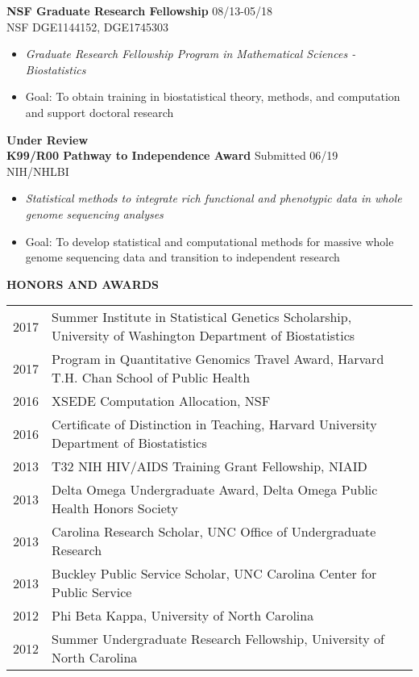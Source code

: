 \documentclass[10pt]{article}
\begin{document}
\textbf{NSF Graduate Research Fellowship} \hfill 08/13-05/18\\
\indent NSF DGE1144152, DGE1745303
\begin{itemize}
	\item \textit{Graduate Research Fellowship Program in Mathematical Sciences - Biostatistics}
	\item Goal: To obtain training in biostatistical theory, methods, and computation and support doctoral research\\
\end{itemize}


\indent \textbf{Under Review}  \\

\textbf{K99/R00 Pathway to Independence Award} \hfill Submitted 06/19\\
\indent NIH/NHLBI
\begin{itemize}
	\item \textit{Statistical methods to integrate rich functional and phenotypic data in whole genome sequencing analyses}
	\item Goal: To develop statistical and computational methods for massive whole genome sequencing data and transition to independent research \\
\end{itemize}

\vspace{0.25cm}

{ \bf HONORS AND AWARDS} \hrulefill \\
 \setlength\intextsep{0mm}
\begin{center}
	\begin{table}[H]
		\centering
		\begin{tabular}{@{}p{1.3cm}@{}@{}p{16.2cm}@{}}
			2017  & Summer Institute in Statistical Genetics Scholarship, University of Washington Department of Biostatistics  \\ 
			2017  & Program in Quantitative Genomics Travel Award, Harvard T.H. Chan School of Public Health  \\ 
			2016  & XSEDE Computation Allocation, NSF            \\ 
			2016  & Certificate of Distinction in Teaching, Harvard University Department of Biostatistics             \\ 
			2013 & T32 NIH HIV/AIDS Training Grant Fellowship, NIAID \\
			2013  & Delta Omega Undergraduate Award, Delta Omega Public Health Honors Society       \\ 
			2013  & Carolina Research Scholar, UNC Office of Undergraduate Research   \\ 
			2013  & Buckley Public Service Scholar, UNC Carolina Center for Public Service    \\ 
			2012  &Phi Beta Kappa, University of North Carolina \\
			2012  & Summer Undergraduate Research Fellowship, University of North Carolina  
		\end{tabular}
	\end{table}
\end{center}
\end{document}
